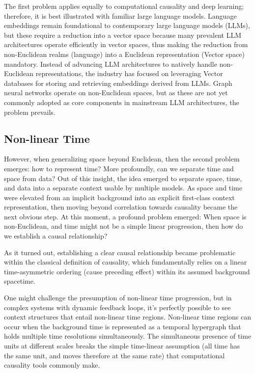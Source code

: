 \documentclass{article}
\begin{document}
The first problem applies equally to computational causality and deep learning; therefore, it is best illustrated with familiar  large language models. Language embeddings remain foundational to contemporary large language models (LLMs), but these require a reduction into a vector space because many prevalent LLM architectures operate efficiently in vector spaces, thus making the reduction from non-Euclidean realms (language) into a Euclidean representation (Vector space) mandatory. Instead of advancing LLM architectures to natively handle non-Euclidean representations, the industry has focused on leveraging Vector databases for storing and retrieving embeddings derived from LLMs. Graph neural networks operate on non-Euclidean spaces, but as these are not yet commonly adopted as core components in mainstream LLM architectures, the problem prevails.

\subsection{Non-linear Time}

However, when generalizing space beyond Euclidean, then the second problem emerges: how to represent time? More profoundly, can we separate time and space from data? Out of this insight, the idea emerged to separate space, time, and data into a separate context usable by multiple models. As space and time were elevated from an implicit background into an explicit first-class context representation, then moving beyond correlation towards causality became the next obvious step. At this moment, a profound problem emerged: When space is non-Euclidean, and time might not be a simple linear progression, then how do we establish a causal relationship?

As it turned out, establishing a clear causal relationship became problematic within the classical definition of causality, which fundamentally relies on a linear time-asymmetric ordering (cause preceding effect) within its assumed background spacetime.

One might challenge the presumption of non-linear time progression, but in complex systems with dynamic feedback loops, it’s perfectly possible to see context structures that entail non-linear time regions. Non-linear time regions can occur when the background time is represented as a temporal hypergraph that holds multiple time resolutions simultaneously. The simultaneous presence of time units at different scales breaks the simple time-linear assumption (all time has the same unit, and moves therefore at the same rate) that computational causality tools commonly make.
\end{document}
